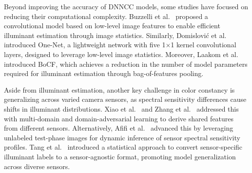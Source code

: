 \par Beyond improving the accuracy of DNNCC models, some studies have focused on reducing their computational complexity. Buzzelli et al.~\cite{buzzelli2024convolutional} proposed a convolutional model based on low-level image features to enable efficient illuminant estimation through image statistics. Similarly, Domislović et al.~\cite{domislovic2022one} introduced One-Net, a lightweight network with five 1$\times$1 kernel convolutional layers, designed to leverage low-level image statistics. Moreover, Laakom et al.~\cite{laakom2020bag} introduced BoCF, which achieves a reduction in the number of model parameters required for illuminant estimation through bag-of-features pooling.
\par Aside from illuminant estimation, another key challenge in color constancy is generalizing across varied camera sensors, as spectral sensitivity differences cause shifts in illuminant distributions. Xiao et al.~\cite{xiao2020multi} and Zhang et al.~\cite{zhang2022domain} addressed this with multi-domain and domain-adversarial learning to derive shared features from different sensors. Alternatively, Afifi et al.~\cite{afifi2021cross} advanced this by leveraging unlabeled test-phase images for dynamic inference of sensor spectral sensitivity profiles. Tang et al.~\cite{tang2022transfer} introduced a statistical approach to convert sensor-specific illuminant labels to a sensor-agnostic format, promoting model generalization across diverse sensors.


